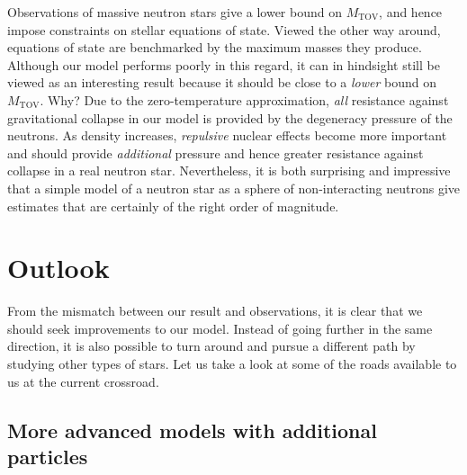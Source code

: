 Observations of massive neutron stars give a lower bound on $M_\text{TOV}$, and hence impose constraints on stellar equations of state.
Viewed the other way around, equations of state are benchmarked by the maximum masses they produce.
Although our model performs poorly in this regard, it can in hindsight still be viewed as an interesting result because it should be close to a \emph{lower} bound on $M_\text{TOV}$.
Why?
Due to the zero-temperature approximation, \emph{all} resistance against gravitational collapse in our model is provided by the degeneracy pressure of the neutrons.
As density increases, \emph{repulsive} nuclear effects become more important and should provide \emph{additional} pressure and hence greater resistance against collapse in a real neutron star. \cite[section 3.9.8]{ref:glendenning}
Nevertheless, it is both surprising and impressive that a simple model of a neutron star as a sphere of non-interacting neutrons give estimates that are certainly of the right order of magnitude.

\section{Outlook}

From the mismatch between our result and observations, it is clear that we should seek improvements to our model.
Instead of going further in the same direction, it is also possible to turn around and pursue a different path by studying other types of stars.
Let us take a look at some of the roads available to us at the current crossroad.

\iffalse
\subsection*{Renormalization}

When we encountered infinite vacuum contributions to the energy density and pressure, we simply argued that they were unphysical and ignored them.
A more precise treatment would be to allow for additional self-interactions in the Dirac Lagrangian \eqref{eq:tft:dirac_lagrangian}, hence renormalizing the neutron mass $m$, modifying the equation of state and ultimately the mass-radius curve.
\TODO{is this correct? is the effect small?}
\TODO{is this really significant, or should i just drop it?}
\fi

\subsection*{More advanced models with additional particles}

